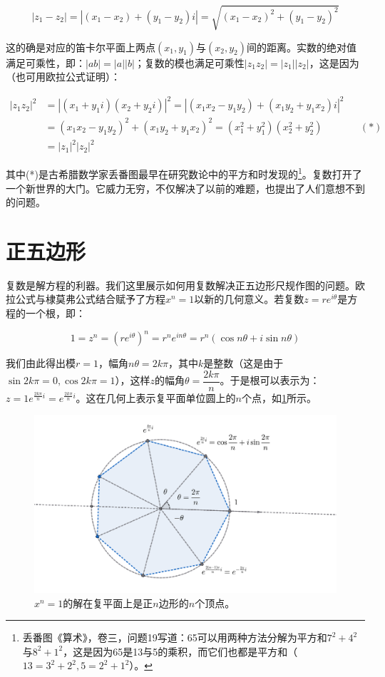 \documentclass[b5paper]{ctexart}
\begin{document}
\[
|z_1 - z_2| = |(x_1 - x_2) + (y_1 - y_2)i| = \sqrt{(x_1 - x_2)^2 + (y_1 - y_2)^2}
\]

这的确是对应的笛卡尔平面上两点$(x_1, y_1)$与$(x_2, y_2)$间的距离。实数的绝对值满足可乘性，即：$|ab| = |a||b|$；复数的模也满足可乘性$|z_1z_2| = |z_1||z_2|$，这是因为（也可用欧拉公式证明）：

\begin{align*}
|z_1z_2|^2 &= |(x_1 + y_1i)(x_2 + y_2i)|^2 = |(x_1x_2 - y_1y_2) + (x_1y_2 + y_1x_2)i|^2 \\
  &= (x_1x_2 - y_1y_2)^2 + (x_1y_2 + y_1x_2)^2 = (x_1^2 + y_1^2)(x_2^2 + y_2^2) && (*) \\
  &= |z_1|^2|z_2|^2
\end{align*}

其中(*)是古希腊数学家丢番图最早在研究数论中的平方和时发现的\footnote{丢番图《算术》，卷三，问题19写道：65可以用两种方法分解为平方和$7^2 + 4^2$与$8^2 + 1^2$，这是因为65是13与5的乘积，而它们也都是平方和（$13 = 3^2 + 2^2, 5 = 2^2 + 1^2$）。}。复数打开了一个新世界的大门。它威力无穷，不仅解决了以前的难题，也提出了人们意想不到的问题。

\section{正五边形}
\label{sec:pentagon-equation}

复数是解方程的利器。我们这里展示如何用复数解决正五边形尺规作图的问题。欧拉公式与棣莫弗公式结合赋予了方程$x^n = 1$以新的几何意义。若复数$z = re^{i\theta}$是方程的一个根，即：

\[
1 = z^n = (re^{i\theta})^n = r^ne^{in\theta} = r^n(\cos n\theta + i\sin n\theta)
\]

我们由此得出模$r = 1$，幅角$n\theta = 2k\pi$，其中$k$是整数（这是由于$\sin 2k\pi = 0, \cos 2k\pi = 1$），这样$z$的幅角$\theta = \dfrac{2k\pi}{n}$。于是根可以表示为：$z = 1e^{\frac{2k\pi}{n}i} = e^{\frac{2k\pi}{n}i}$。这在几何上表示复平面单位圆上的$n$个点，如\cref{fig:heptagon-z}所示。

\begin{figure}[htbp]
  \centering
  \includegraphics[scale=0.33]{img/heptagon-z}
  \caption{$x^n = 1$的解在复平面上是正$n$边形的$n$个顶点。}
 \label{fig:heptagon-z}
\end{figure}
\end{document}
